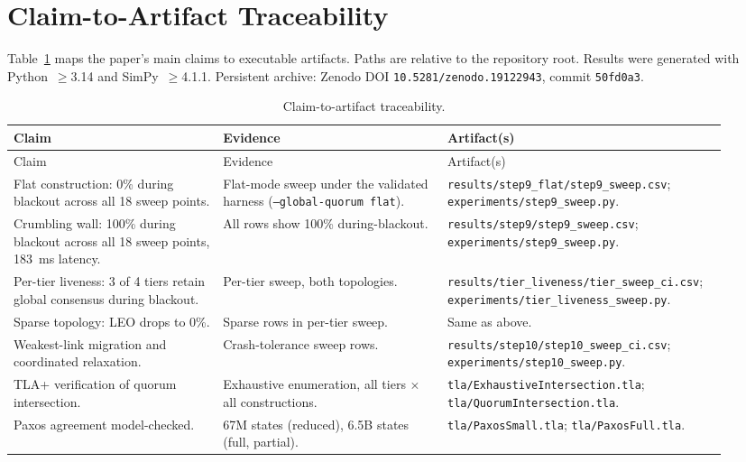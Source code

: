 \documentclass[11pt]{article}
\begin{document}
\appendix
\section{Claim-to-Artifact Traceability}
\label{app:traceability}
Table~\ref{tab:traceability} maps the paper's main claims to executable artifacts. Paths are relative to the repository root. Results were generated with Python~$\ge$3.14 and SimPy~$\ge$4.1.1. Persistent archive: Zenodo DOI \texttt{10.5281/zenodo.19122943}, commit \texttt{50fd0a3}.

\begin{longtable}{p{0.28\linewidth}p{0.30\linewidth}p{0.34\linewidth}}
\caption{Claim-to-artifact traceability.}
\label{tab:traceability} \\
\toprule
Claim & Evidence & Artifact(s) \\
\midrule
\endfirsthead
\toprule
Claim & Evidence & Artifact(s) \\
\midrule
\endhead
Flat construction: 0\% during blackout across all 18 sweep points. & Flat-mode sweep under the validated harness (\texttt{--global-quorum flat}). & \texttt{results/step9\_flat/\allowbreak step9\_sweep.csv}; \texttt{experiments/\allowbreak step9\_sweep.py}. \\
Crumbling wall: 100\% during blackout across all 18 sweep points, 183~ms latency. & All rows show 100\% during-blackout. & \texttt{results/step9/\allowbreak step9\_sweep.csv}; \texttt{experiments/\allowbreak step9\_sweep.py}. \\
Per-tier liveness: 3 of 4 tiers retain global consensus during blackout. & Per-tier sweep, both topologies. & \texttt{results/tier\_liveness/\allowbreak tier\_sweep\_ci.csv}; \texttt{experiments/\allowbreak tier\_liveness\_sweep.py}. \\
Sparse topology: LEO drops to 0\%. & Sparse rows in per-tier sweep. & Same as above. \\
Weakest-link migration and coordinated relaxation. & Crash-tolerance sweep rows. & \texttt{results/step10/\allowbreak step10\_sweep\_ci.csv}; \texttt{experiments/\allowbreak step10\_sweep.py}. \\
TLA+ verification of quorum intersection. & Exhaustive enumeration, all tiers $\times$ all constructions. & \texttt{tla/\allowbreak ExhaustiveIntersection.tla}; \texttt{tla/\allowbreak QuorumIntersection.tla}. \\
Paxos agreement model-checked. & 67M states (reduced), 6.5B states (full, partial). & \texttt{tla/\allowbreak PaxosSmall.tla}; \texttt{tla/\allowbreak PaxosFull.tla}. \\
\bottomrule
\end{longtable}



\end{document}
